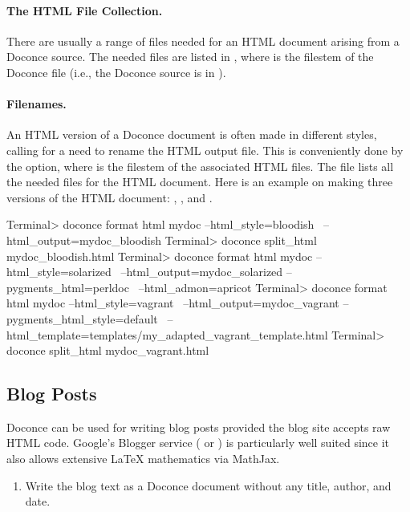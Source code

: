 \documentclass[%
oneside,                 %
final,                   %
10pt]{article}
\begin{document}
{{{\paragraph{The HTML File Collection.}
There are usually a range of files needed for an HTML document arising
from a Doconce source. The needed files are listed in
, where  is the filestem of
the Doconce file (i.e., the Doconce source is in ).

\paragraph{Filenames.}
An HTML version of a Doconce document is often made in different styles,
calling for a need to rename the HTML output file. This is conveniently
done by the  option, where  is the
filestem of the associated HTML files. The
 file lists all the needed files
for the HTML document. Here is an example on making three versions of
the HTML document: , , and
.

\bsys
Terminal> doconce format html mydoc --html_style=bloodish \ 
          --html_output=mydoc_bloodish
Terminal> doconce split_html mydoc_bloodish.html
Terminal> doconce format html mydoc --html_style=solarized \ 
          --html_output=mydoc_solarized --pygments_html=perldoc \ 
          --html_admon=apricot
Terminal> doconce format html mydoc --html_style=vagrant \ 
          --html_output=mydoc_vagrant --pygments_html_style=default \ 
          --html_template=templates/my_adapted_vagrant_template.html
Terminal> doconce split_html mydoc_vagrant.html
\esys

\subsection{Blog Posts}

Doconce can be used for writing blog posts provided the blog site accepts
raw HTML code. Google's Blogger service ( or
) is particularly well suited since it also
allows extensive {\LaTeX} mathematics via MathJax.

\begin{enumerate}
\item Write the blog text as a Doconce document without any
   title, author, and date.


\end{enumerate}}}}
\end{document}
